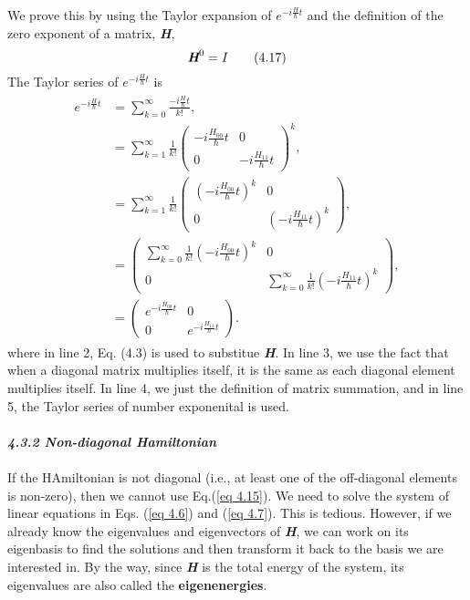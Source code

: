 \documentclass{article}
\begin{document}
We prove this by using the Taylor expansion of $e^{-i\frac{H}{\hbar}t}$
and the definition of the zero exponent of a matrix, \textit{\textbf{H}},
\begin{equation} \label{eq 4.17}
    \textit{\textbf{H}}^0 = I \tag{4.17}
\end{equation}
The Taylor series of $e^{-i\frac{H}{\hbar}t}$ is
\begin{align} \label{eq 4.18}
    \begin{split}
        e^{-i\frac{H}{\hbar}t} &= \sum_{k=0}^{\infty}\frac{-i\frac{H}{\hbar}t}{k!},\\
        &= \sum_{k=1}^{\infty}\frac{1}{k!}\begin{pmatrix}
            -i\frac{H_{00}}{\hbar}t & 0\\0 &-i\frac{H_{11}}{\hbar}t
        \end{pmatrix}^k,\\
        &= \sum_{k=1}^{\infty}\frac{1}{k!}\begin{pmatrix}
            (-i\frac{H_{00}}{\hbar}t)^k & 0\\0 &(-i\frac{H_{11}}{\hbar}t)^k
        \end{pmatrix},\\
        &=\begin{pmatrix}
            \sum_{k=0}^{\infty}\frac{1}{k!}(-i\frac{H_{00}}{\hbar}t)^k &0\\
            0 & \sum_{k=0}^{\infty}\frac{1}{k!}(-i\frac{H_{11}}{\hbar}t)^k
        \end{pmatrix},\\
        &= \begin{pmatrix}
            e^{-i\frac{H_{00}}{\hbar}t}& 0\\0 &e^{-i\frac{H_{11}}{\hbar}t}
        \end{pmatrix}.
    \end{split} \tag{4.18}
\end{align}
where in line 2, Eq. (4.3) is used to substitue \textit{\textbf{H}}. In line 3, we use the fact that
when a diagonal matrix multiplies itself, it is the same as each diagonal element multiplies
itself. In line 4, we just the definition of matrix summation, and in line 5, the Taylor series
of number exponenital is used.
\\\\
\textbf{\textit{\large 4.3.2 Non-diagonal Hamiltonian}}\\\\
If the HAmiltonian is not diagonal (i.e., at least one of the off-diagonal elements is non-zero),
then we cannot use Eq.(\ref{eq 4.15}). We need to solve the system of linear
equations in Eqs. (\ref{eq 4.6}) and (\ref{eq 4.7}). This is tedious. However, if we
already know the eigenvalues and eigenvectors of \textit{\textbf{H}}, we can work on its
eigenbasis to find the solutions and then transform it back to the basis we are interested in.
By the way, since \textit{\textbf{H}} is the total energy of the system, its eigenvalues are also called the \textbf{eigenenergies}.
\end{document}
